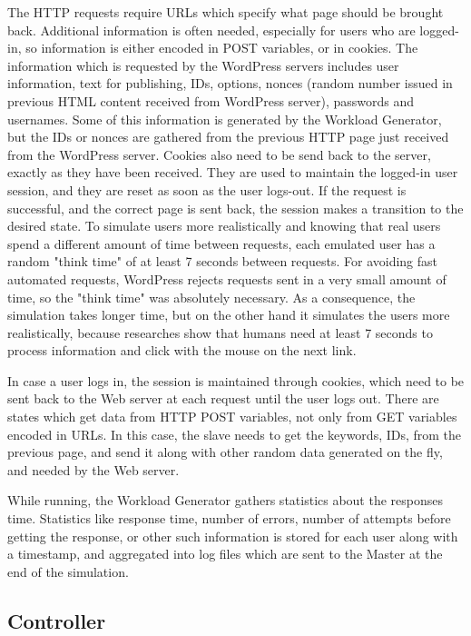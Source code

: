 The HTTP requests require URLs which specify what page should be brought back. Additional information is often needed, especially for users who are logged-in, so information is either encoded in POST variables, or in cookies. The information which is requested by the WordPress servers includes user information, text for publishing, IDs, options, nonces (random number issued in previous HTML content received from WordPress server), passwords and usernames. Some of this information is generated by the Workload Generator, but the IDs or nonces are gathered from the previous HTTP page just received from the WordPress server. Cookies also need to be send back to the server, exactly as they have been received. They are used to maintain the logged-in user session, and they are reset as soon as the user logs-out. If the request is successful, and the correct page is sent back, the session makes a transition to the desired state. To simulate users more realistically and knowing that real users spend a different amount of time between requests, each emulated user has a random "think time" of at least 7 seconds between requests. For avoiding fast automated requests, WordPress rejects requests sent in a very small amount of time, so the "think time" was absolutely necessary. As a consequence, the simulation takes longer time, but on the other hand it simulates the users more realistically, because researches show that humans need at least 7 seconds to process information and click with the mouse on the next link.

In case a user logs in, the session is maintained through cookies, which need to be sent back to the Web server at each request until the user logs out. There are states which get data from HTTP POST variables, not only from GET variables encoded in URLs. In this case, the slave needs to get the keywords, IDs, from the previous page, and send it along with other random data generated on the fly, and needed by the Web server. 

While running, the Workload Generator gathers statistics about the responses time. Statistics like response time, number of errors, number of attempts before getting the response, or other such information is stored for each user along with a timestamp, and aggregated into log files which are sent to the Master at the end of the simulation.

\subsection{Controller}
\label{sub-sec:controller}

